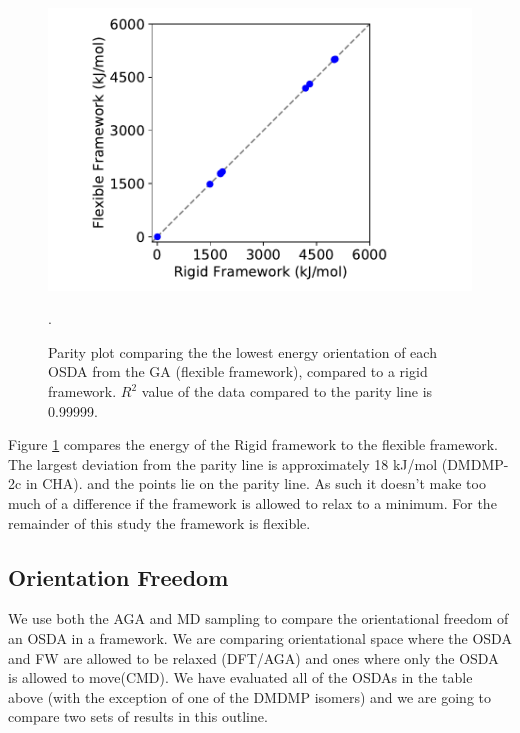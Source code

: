 \documentclass[journal=accacs,manuscript=article, email=true, layout=traditional]{achemso}
\begin{document}
\begin{figure}
\begin{center}

\includegraphics[scale=.5,trim={0cm 0cm 0cm 0cm},clip]{./Figures/Framework-flex.pdf}
\caption{Parity plot comparing the the lowest energy orientation of each OSDA from the GA (flexible framework), compared to a rigid framework. $R^{2}$ value of the data compared to the parity line is 0.99999. }. 
\label{fig:Rig_v_Flex} 

\end{center}
\end{figure}

Figure \ref{fig:Rig_v_Flex} compares the energy of the Rigid framework to the flexible framework. The largest deviation from the parity line is approximately 18 kJ/mol (DMDMP-2c in CHA). and the points lie on the parity line. As such it doesn't make too much of a difference if the framework is allowed to relax to a minimum. For the remainder of this study the framework is flexible.

\subsection{Orientation Freedom}
\label{sec:org4c19826}
We use both the AGA and MD sampling to compare the orientational freedom of an OSDA in a framework. We are comparing orientational space where the OSDA and FW are allowed to be relaxed (DFT/AGA) and ones where only the OSDA is allowed to move(CMD). We have evaluated all of the OSDAs in the table above (with the exception of one of the DMDMP isomers) and we are going to compare two sets of results in this outline. 
\end{document}
